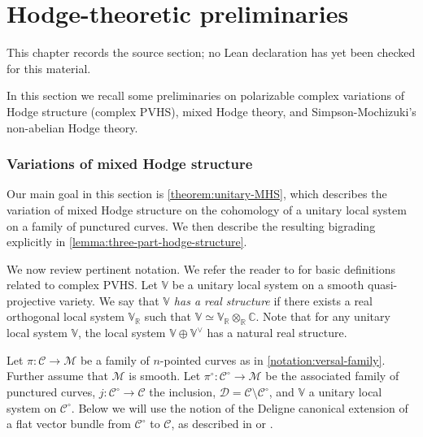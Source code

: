 \chapter{Hodge-theoretic preliminaries}
\label{canonical-representations-surface-groups-chapter-04}

\begin{remark}
\label{canonical-representations-surface-groups-chapter-04-source}
This chapter records the source section; no Lean declaration has yet been checked for this material.
\notready
\end{remark}

\label{section:Hodge-theoretic-preliminaries}
In this section we recall some preliminaries on polarizable complex variations
of Hodge structure (complex PVHS), mixed Hodge theory, and Simpson-Mochizuki's non-abelian Hodge theory.

\subsection{Variations of mixed Hodge structure}
\label{subsection:vmhs}
Our main goal in this section is \autoref{theorem:unitary-MHS},
which describes the variation of mixed Hodge structure on the cohomology of a
unitary local system on a family of punctured curves.
We then describe the resulting bigrading explicitly in
\autoref{lemma:three-part-hodge-structure}.


We now review pertinent notation.
We refer the reader to \cite[\S5]{LL:geometric-local-systems} for basic definitions
related to complex PVHS.
Let $\mathbb V$ be a unitary local system on a smooth quasi-projective variety.
We say that \emph{$\mathbb{V}$ has a real structure} if there exists a real orthogonal local system $\mathbb{V}_\mathbb{R}$ such that
$\mathbb{V}\simeq \mathbb{V}_\mathbb{R}\otimes_\mathbb{R}\mathbb{C}$. Note that
for any unitary local system $\mathbb{V}$, the local system
$\mathbb{V}\oplus\mathbb{V}^\vee$ has a natural real structure.

Let $\pi: \mathscr{C} \to \mathscr{M}$ be a family of $n$-pointed curves as in
\autoref{notation:versal-family}.
Further assume that $\mathscr{M}$ is smooth.
Let $\pi^\circ: \mathscr{C}^\circ\to
\mathscr{M}$ be the associated family of punctured curves,
$j : \mathscr C^\circ \to \mathscr C$ the inclusion,
$\mathscr{D}=\mathscr{C}\setminus\mathscr{C}^\circ$,
and $\mathbb V$ a unitary local system on $\mathscr C^\circ$.
Below we will use the notion of the Deligne canonical extension of a flat vector bundle from $\mathscr C^\circ$
to $\mathscr C$, as described in
\cite[Remarques 5.5(i)]{deligne:regular-singular} or \cite[Definition
4.1.2]{LL:geometric-local-systems}.

